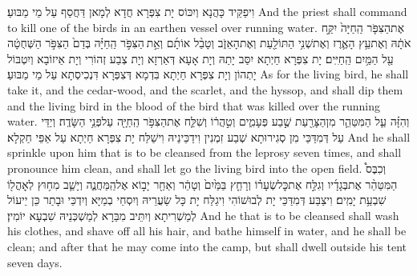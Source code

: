 {וִיפַקֵּיד כָּהֲנָא וְיִכּוֹס יָת צִפְּרָא חֲדָא לְמָאן דַּחֲסַף עַל מֵי מַבּוּעַ׃}
{And the priest shall command to kill one of the birds in an earthen vessel over running water.}{}
{אֶת\maqqaf הַצִּפֹּ֤ר הַֽחַיָּה֙ יִקַּ֣ח אֹתָ֔הּ וְאֶת\maqqaf עֵ֥ץ הָאֶ֛רֶז וְאֶת\maqqaf שְׁנִ֥י הַתּוֹלַ֖עַת וְאֶת\maqqaf הָאֵזֹ֑ב וְטָבַ֨ל אוֹתָ֜ם וְאֵ֣ת \legarmeh  הַצִּפֹּ֣ר הַֽחַיָּ֗ה בְּדַם֙ הַצִּפֹּ֣ר הַשְּׁחֻטָ֔ה עַ֖ל הַמַּ֥יִם הַֽחַיִּֽים׃}
{יָת צִפְּרָא חַיְתָא יִסַּב יָתַהּ וְיָת אָעָא דְּאַרְזָא וְיָת צְבַע זְהוֹרִי וְיָת אֵיזוֹבָא וְיִטְבּוֹל יָתְהוֹן וְיָת צִפְּרָא חַיְתָא בִּדְמָא דְּצִפְּרָא דִּנְכִיסְתָא עַל מֵי מַבּוּעַ׃}
{As for the living bird, he shall take it, and the cedar-wood, and the scarlet, and the hyssop, and shall dip them and the living bird in the blood of the bird that was killed over the running water.}{}
{וְהִזָּ֗ה עַ֧ל הַמִּטַּהֵ֛ר מִן\maqqaf הַצָּרַ֖עַת שֶׁ֣בַע פְּעָמִ֑ים וְטִ֣הֲר֔וֹ וְשִׁלַּ֛ח אֶת\maqqaf הַצִּפֹּ֥ר הַֽחַיָּ֖ה עַל\maqqaf פְּנֵ֥י הַשָּׂדֶֽה׃}
{וְיַדֵּי עַל דְּמִדַּכֵּי מִן סְגִירוּתָא שְׁבַע זִמְנִין וִידַכֵּינֵיהּ וִישַׁלַּח יָת צִפְּרָא חַיְתָא עַל אַפֵּי חַקְלָא׃}
{And he shall sprinkle upon him that is to be cleansed from the leprosy seven times, and shall pronounce him clean, and shall let go the living bird into the open field.}{}
{וְכִבֶּס֩ הַמִּטַּהֵ֨ר אֶת\maqqaf בְּגָדָ֜יו וְגִלַּ֣ח אֶת\maqqaf כׇּל\maqqaf שְׂעָר֗וֹ וְרָחַ֤ץ בַּמַּ֙יִם֙ וְטָהֵ֔ר וְאַחַ֖ר יָב֣וֹא אֶל\maqqaf הַֽמַּחֲנֶ֑ה וְיָשַׁ֛ב מִח֥וּץ לְאׇהֳל֖וֹ שִׁבְעַ֥ת יָמִֽים׃}
{וִיצַבַּע דְּמִדַּכֵּי יָת לְבוּשׁוֹהִי וִיגַלַּח יָת כָּל שַׂעֲרֵיהּ וְיִסְחֵי בְמַיָּא וְיִדְכֵּי וּבָתַר כֵּן יֵיעוֹל לְמַשְׁרִיתָא וְיִתֵּיב מִבַּרָא לְמַשְׁכְּנֵיהּ שִׁבְעָא יוֹמִין׃}
{And he that is to be cleansed shall wash his clothes, and shave off all his hair, and bathe himself in water, and he shall be clean; and after that he may come into the camp, but shall dwell outside his tent seven days.}{}
